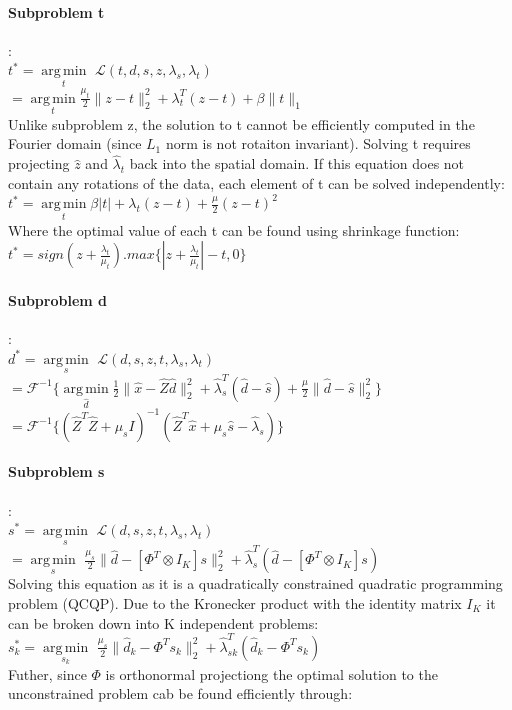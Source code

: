\documentclass[a4paper,10pt]{article}
\DeclareMathOperator*{\argmin}{arg\,min}
\begin{document}
\paragraph{Subproblem t}:\vspace{0.5cm}\\
$t^* =  \underset{t}{\argmin}$ $ \mathcal{L}(t,d,s,z,\lambda_s,\lambda_t)$\\
$ =  \underset{t}{\argmin}\frac{\mu_t}{2} \|z - t\|^2_2 + \lambda_t^T(z-t) + \beta\|t\|_1$\\
Unlike subproblem z, the solution to t cannot be efficiently computed in the Fourier domain (since $L_1$ norm is not rotaiton invariant). Solving t requires projecting $\hat{z}$ and $\hat{\lambda}_t$ back into the spatial domain. If this equation does not contain any rotations of the data, each element of t can be solved independently:\vspace{0.3cm}\\
$t^* =  \underset{t}{\argmin} \beta |t| + \lambda_t(z-t) + \frac{\mu}{2}(z-t)^2$\\
Where the optimal value of each t can be found using shrinkage function:\vspace{0.5cm}\\
$t^* = sign(z + \frac{\lambda_t}{\mu_t}) . max\{|z + \frac{\lambda_t}{\mu_t} | - t , 0\}$

\paragraph{Subproblem d}:\vspace{0.5cm}\\
$d^* =  \underset{s}{\argmin}$ $  \mathcal{L}(d,s,z,t,\lambda_s, \lambda_t)$\\ 
$ = \mathcal{F}^{-1} \{ \underset{\hat{d}}{\argmin}\frac{1}{2} \|\hat{x} - \hat{Z}\hat{d}\|^2_2 + \hat{\lambda}_s^T(\hat{d}- \hat{s}) + \frac{\mu}{2}\|\hat{d} - \hat{s}\|^2_2\}$\\
$ = \mathcal{F}^{-1}\{(\hat{Z}^T \hat{Z} + \mu_s I)^{-1} (\hat{Z}^T \hat{x} + \mu_s \hat{s} - \hat{\lambda}_s)\}$
\paragraph{Subproblem s}:\vspace{0.5cm}\\
$s^* =\underset{s}{\argmin}$ $  \mathcal{L}(d,s,z,t,\lambda_s, \lambda_t) $\\
$  = \underset{s}{\argmin}$ $\frac{\mu_s}{2} \|\hat{d} - [\Phi^T \otimes I_K]s\|^2_2 + \hat{\lambda}_s^T(\hat{d} - [\Phi^T \otimes I_K]s)$\\
Solving this equation as it is a quadratically constrained quadratic programming problem (QCQP).  Due to the Kronecker product with the identity matrix $I_K$ it can be broken down into K independent problems:\\
$s^*_k = \underset{s_k}{\argmin}$ $\frac{\mu_s}{2} \|\hat{d}_k  - \Phi^T s_k\|^2_2 + \hat{\lambda}_{sk}^T(\hat{d}_k - \Phi^T s_k)$\\
Futher, since $\Phi$ is orthonormal projectiong the optimal solution to the unconstrained problem cab be found efficiently through:\\
\end{document}

